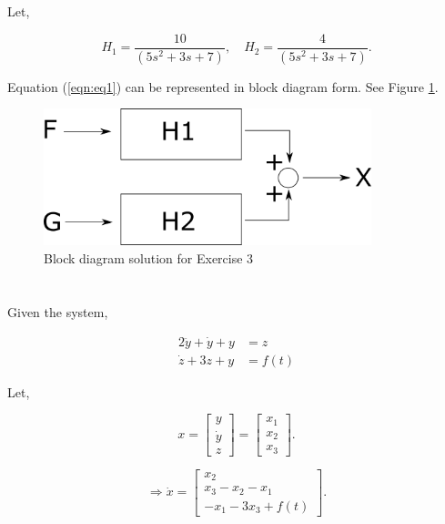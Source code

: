 \documentclass[12pt]{article}
\numberwithin{equation}{section}
\begin{document}
  Let,

  \[
      H_1 = \frac{10}{\left( 5 s ^2 + 3s + 7 \right)}, \quad H_2 = \frac{4}{\left( 5 s ^2 + 3s + 7 \right)}
    .\]

  Equation (\ref{eqn:eq1}) can be represented in block diagram form. See Figure \ref{fig:problem3}.

  \begin{figure}
    \centering
    \includegraphics[width=0.85\textwidth]{figures/problem3.png}
    \caption{Block diagram solution for Exercise 3}
    \label{fig:problem3}
  \end{figure}

  \newpage


  \section{}

  Given the system,

  \[
      \begin{aligned}
        2 \ddot y + \dot y + y &= z \\
        \dot z + 3z + y &= f(t)
      \end{aligned}
    \]

  Let,

  \[
    x =
    \begin{bmatrix}
      y \\ \dot y \\ z
    \end{bmatrix}
      =
    \begin{bmatrix}
      x_1 \\ x_2 \\ x_3
    \end{bmatrix}
    .\]

  \[
      \Rightarrow \dot x =
      \begin{bmatrix}
        x_2 \\ x_3 - x_2 - x_1 \\ -x_1 -3x_3 + f(t)
      \end{bmatrix}
    .\]
\end{document}
